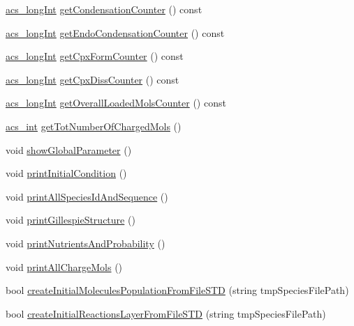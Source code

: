 \begin{DoxyCompactItemize}
\item 
\hyperlink{acs__headers_8h_a19319d75f02db4308bc5c0026d98cd85}{acs\-\_\-long\-Int} \hyperlink{classenvironment_a0fc62131bf552c2a995c7ddc461828cd}{get\-Condensation\-Counter} () const 
\item 
\hyperlink{acs__headers_8h_a19319d75f02db4308bc5c0026d98cd85}{acs\-\_\-long\-Int} \hyperlink{classenvironment_aaa23d550cfa37344dd3bb4d5767e6ea0}{get\-Endo\-Condensation\-Counter} () const 
\item 
\hyperlink{acs__headers_8h_a19319d75f02db4308bc5c0026d98cd85}{acs\-\_\-long\-Int} \hyperlink{classenvironment_a5d72675f37c3936c58d27480613a9ab6}{get\-Cpx\-Form\-Counter} () const 
\item 
\hyperlink{acs__headers_8h_a19319d75f02db4308bc5c0026d98cd85}{acs\-\_\-long\-Int} \hyperlink{classenvironment_abf2f63b22c52e17f6089f098651584b8}{get\-Cpx\-Diss\-Counter} () const 
\item 
\hyperlink{acs__headers_8h_a19319d75f02db4308bc5c0026d98cd85}{acs\-\_\-long\-Int} \hyperlink{classenvironment_a75329459280bc79537a5c08883449a63}{get\-Overall\-Loaded\-Mols\-Counter} () const 
\item 
\hyperlink{acs__headers_8h_a8d277355641a098190360234e2ebde35}{acs\-\_\-int} \hyperlink{classenvironment_aadb5c442d5c9d16a0d6b2e90715dda94}{get\-Tot\-Number\-Of\-Charged\-Mols} ()
\item 
void \hyperlink{classenvironment_af959a6b6a72cb6226fef7f0e7fab5c0c}{show\-Global\-Parameter} ()
\item 
void \hyperlink{classenvironment_a429c2529badaeda72e553f500b990e11}{print\-Initial\-Condition} ()
\item 
void \hyperlink{classenvironment_a48d8fd9d8d5c9c31f0b4af87c8cbd28f}{print\-All\-Species\-Id\-And\-Sequence} ()
\item 
void \hyperlink{classenvironment_aa3a18c59f6127c642603a98c1b3a2224}{print\-Gillespie\-Structure} ()
\item 
void \hyperlink{classenvironment_ad8fcefe5325382fb307627c7e8362ba8}{print\-Nutrients\-And\-Probability} ()
\item 
void \hyperlink{classenvironment_af579052ed051a2e3516218220d238303}{print\-All\-Charge\-Mols} ()
\item 
bool \hyperlink{classenvironment_aee77384e63261db28ef5677844bdbaf6}{create\-Initial\-Molecules\-Population\-From\-File\-S\-T\-D} (string tmp\-Species\-File\-Path)
\item 
bool \hyperlink{classenvironment_a2f181e0d3ad1e8062ba0a8c9358ebc58}{create\-Initial\-Reactions\-Layer\-From\-File\-S\-T\-D} (string tmp\-Species\-File\-Path)

\end{DoxyCompactItemize}
